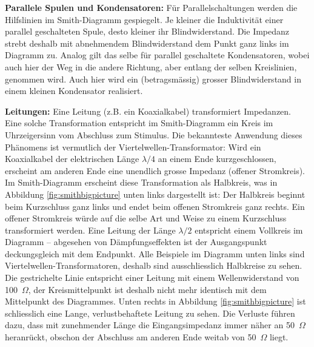 \documentclass[twoside,a4paper,11pt,halfparskip,DIV=11,notitlepage]{scrartcl}
\newcommand{\Ohm}{$\Omega$\xspace}
\begin{document}
\textbf{Parallele Spulen und Kondensatoren:} Für Parallelschaltungen werden die Hilfslinien im Smith-Diagramm
gespiegelt. Je kleiner die Induktivität einer parallel geschalteten Spule, desto kleiner ihr Blindwiderstand.
Die Impedanz strebt deshalb mit abnehmendem Blindwiderstand dem Punkt ganz links im Diagramm zu. Analog gilt
das selbe für parallel geschaltete Kondensatoren, wobei auch hier der Weg in die andere Richtung, aber entlang
der selben Kreislinien, genommen wird. Auch hier wird ein (betragsmässig) grosser Blindwiderstand in einem
kleinen Kondensator realisiert.

\textbf{Leitungen:} Eine Leitung (z.B. ein Koaxialkabel) transformiert Impedanzen. Eine solche Transformation
entspricht im Smith-Diagramm ein Kreis im Uhrzeigersinn vom Abschluss zum
Stimulus. Die bekannteste Anwendung dieses Phänomens ist vermutlich der Viertelwellen-Transformator: Wird ein
Koaxialkabel der elektrischen Länge $\lambda/4$ an einem Ende kurzgeschlossen, erscheint am anderen Ende eine
unendlich grosse Impedanz (offener Stromkreis). Im Smith-Diagramm erscheint diese Transformation als Halbkreis,
was in Abbildung \ref{fig:smithbigpicture} unten links dargestellt ist: Der Halbkreis beginnt beim Kurzschluss
ganz links und endet beim offenen Stromkreis ganz rechts. Ein offener Stromkreis würde auf die selbe Art und
Weise zu einem Kurzschluss transformiert werden. Eine Leitung der Länge $\lambda/2$ entspricht einem Vollkreis
im Diagramm -- abgesehen von Dämpfungseffekten ist der Ausgangspunkt deckungsgleich mit dem Endpunkt. Alle
Beispiele im Diagramm unten links sind Viertelwellen-Transformatoren, deshalb sind ausschliesslich Halbkreise
zu sehen.  Die gestrichelte Linie entspricht einer Leitung mit einem Wellenwiderstand von 100~\Ohm, der
Kreismittelpunkt ist deshalb nicht mehr identisch mit dem Mittelpunkt des Diagrammes. Unten rechts in Abbildung
\ref{fig:smithbigpicture} ist schliesslich eine Lange, verlustbehaftete Leitung zu sehen. Die Verluste führen
dazu, dass mit zunehmender Länge die Eingangsimpedanz immer näher an 50~\Ohm heranrückt, obschon der Abschluss
am anderen Ende weitab von 50~\Ohm liegt.
\end{document}
